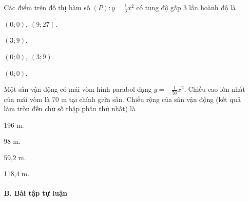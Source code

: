 \documentclass[%
    fontsize=12pt,%
    chapterprefix=false,%
    open=right,%
    twoside=false,%
    numbers=noenddot,%
    headings=optiontohead,%
    final,%
    DIV=15,%
    parskip=half %
]{scrbook}
\begin{document}
\begin{tracnghiem}
\item Các điểm trên đồ thị hàm số $(P): y = \frac{1}{3}x^2$ có tung độ gấp 3 lần hoành độ là
\begin{options}
  \item $(0; 0),\ (9; 27)$.
  \item $(3; 9)$.
  \item $(0; 0),\ (3; 9)$.
  \item $(0; 0)$.
\end{options}

\item Một sân vận động có mái vòm hình parabol dạng $ y = -\frac{1}{50}x^2 $. Chiều cao lớn nhất của mái vòm là 70 m tại chính giữa sân. Chiều rộng của sân vận động (kết quả làm tròn đến chữ số thập phân thứ nhất) là
\begin{options}
  \item 196 m.
  \item 98 m.
  \item 59,2 m.
  \item 118,4 m.
\end{options}

\end{tracnghiem}

\paragraph{B. Bài tập tự luận}
\end{document}
